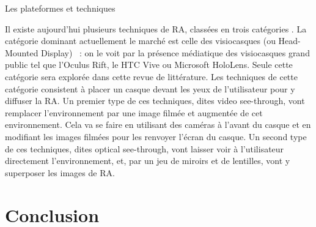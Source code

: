 Les plateformes et techniques

Il existe aujourd'hui plusieurs techniques de RA, classées en trois catégories . La catégorie dominant actuellement le marché est celle des visiocasques (ou \foreignlanguage{english}{Head-Mounted Display}) \citep{VanKrevelenPoelman2010}~: on le voit par la présence médiatique des visiocasques grand public tel que l'Oculus Rift, le HTC Vive ou Microsoft HoloLens. Seule cette catégorie sera explorée dans cette revue de littérature. Les techniques de cette catégorie consistent à placer un casque devant les yeux de l'utilisateur pour y diffuser la RA. Un premier type de ces techniques, dites \foreignlanguage{english}{video see-through}, vont remplacer l'environnement par une image filmée et augmentée de cet environnement. Cela va se faire en utilisant des caméras à l'avant du casque et en modifiant les images filmées pour les renvoyer l'écran du casque. Un second type de ces techniques, dites \foreignlanguage{english}{optical see-through}, vont laisser voir à l'utilisateur directement l'environnement, et, par un jeu de miroirs et de lentilles, vont y superposer les images de RA.


\section*{Conclusion}
